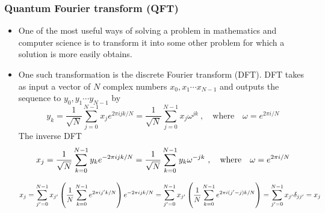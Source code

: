 \documentclass[]{book}
\theoremstyle{nonumberplain}
\begin{document}
\subsubsection{Quantum Fourier transform (QFT)} 
\begin{itemize}
	\item One of the most useful ways of solving a problem in mathematics and computer science is to transform it into some other problem for which a solution is more easily obtains.
	\item One such transformation is the discrete Fourier transform (DFT). DFT takes as input a vector of $N$ complex numbers $x_{0},x_{1}\cdots x_{N-1}$ and outputs the sequence to $y_{0},y_{1}\cdots y_{N-1}$ by 
\[
	y_{k}=\frac{1}{\sqrt{N}} \sum^{N-1}_{j=0} x_{j}e^{2\pi i j k /N} = \frac{1}{\sqrt{N}} \sum^{N-1}_{j=0} x_{j}\omega^{jk}\ ,\quad \text{where} \quad \omega=e^{2\pi i /N}
\] 		
The inverse DFT
$$
x_{j} = \frac{1}{\sqrt{N}} \sum^{N-1}_{k=0} y_{k}e^{-2\pi i j k /N}=\frac{1}{\sqrt{N}} \sum^{N-1}_{k=0} y_{k}\omega^{-jk} \\
 \ ,\quad \text{where} \quad \omega=e^{2\pi i /N}
$$

\[
x_{j}  = \sum_{j'=0}^{N-1} {x_{j'}} \left(\frac{1}{N} \sum_{k=0}^{N-1} {e^{2 \pi ij'k/N}} \right) e^{-2 \pi ijk/N} \\
    = \sum_{j'=0}^{N-1} x_{j'} \left( \frac{1}{N} \sum_{k=0}^{N-1} {e^{2 \pi i(j'-j)k/N}} \right) = \sum_{j'=0}^{N-1} x_{j'} \delta_{jj'}=x_{j}
\]


\end{itemize}
\end{document}
